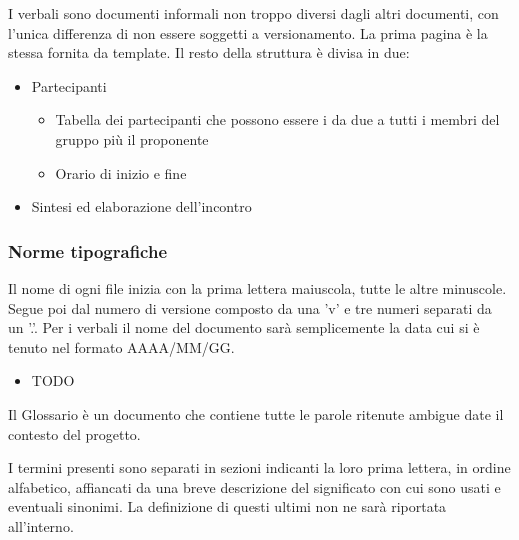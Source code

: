 
        I verbali sono documenti informali non troppo diversi dagli altri documenti, con l'unica differenza
        di non essere soggetti a versionamento.
        La prima pagina è la stessa fornita da template.
        Il resto della struttura è divisa in due:
        \begin{itemize}
          \item Partecipanti
          \begin{itemize}
            \item Tabella dei partecipanti che possono essere i da due a tutti i membri del gruppo più il proponente
            \item Orario di inizio e fine
          \end{itemize}
          \item Sintesi ed elaborazione dell'incontro
        \end{itemize}

\subsubsection{Norme tipografiche}

    Il nome di ogni file inizia con la prima lettera maiuscola, tutte le altre minuscole.
    Segue poi dal numero di versione composto da una 'v' e tre numeri separati da un '.'.
    Per i verbali il nome del documento sarà semplicemente la data cui si è tenuto nel formato
    AAAA/MM/GG.

    \begin{itemize}
    \item TODO
    \end{itemize}

    Il Glossario è un documento che contiene tutte le parole ritenute ambigue date il contesto del progetto.

    I termini presenti sono separati in sezioni indicanti la loro prima lettera, in ordine alfabetico, affiancati
    da una breve descrizione del significato con cui sono usati e eventuali sinonimi.
    La definizione di questi ultimi non ne sarà riportata all'interno.

